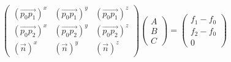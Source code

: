 \documentclass{article}
\begin{document}
\thispagestyle{empty}

$$
\begin{pmatrix}
(\overrightarrow{p_0p_1})^x & (\overrightarrow{p_0p_1})^y & (\overrightarrow{p_0p_1})^z \\
(\overrightarrow{p_0p_2})^x & (\overrightarrow{p_0p_2})^y & (\overrightarrow{p_0p_2})^z \\
(\vec{n})^x & (\vec{n})^y & (\vec{n})^z
\end{pmatrix}
\begin{pmatrix}A\\B\\C\end{pmatrix} = 
\begin{pmatrix}f_1-f_0 \\f_2-f_0 \\0\end{pmatrix}
$$
\end{document}
